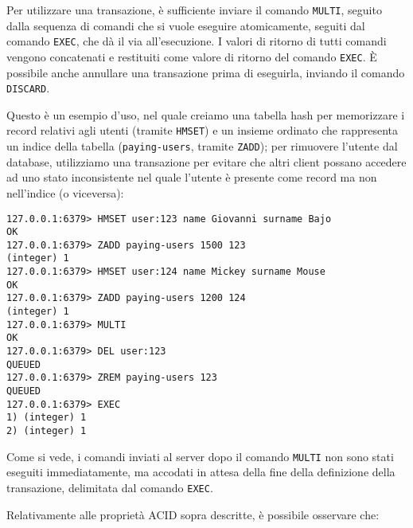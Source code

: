 Per utilizzare una transazione, è sufficiente inviare il comando \verb|MULTI|, seguito dalla 
sequenza di comandi che si vuole eseguire atomicamente, seguiti dal comando \verb|EXEC|, che dà
il via all'esecuzione. I valori di ritorno di tutti comandi vengono concatenati e restituiti come
valore di ritorno del comando \verb|EXEC|. È possibile anche annullare una transazione prima di
eseguirla, inviando il comando \verb|DISCARD|.

Questo è un esempio d'uso, nel quale creiamo una tabella hash per memorizzare i record relativi
agli utenti (tramite \verb|HMSET|) e un insieme ordinato che rappresenta un indice della tabella
(\verb|paying-users|, tramite \verb|ZADD|); per rimuovere l'utente dal database, utilizziamo una
transazione per evitare che altri client possano accedere ad uno stato inconsistente nel quale
l'utente è presente come record ma non nell'indice (o viceversa):

\medskip
\begin{lstlisting}
127.0.0.1:6379> HMSET user:123 name Giovanni surname Bajo
OK
127.0.0.1:6379> ZADD paying-users 1500 123
(integer) 1
127.0.0.1:6379> HMSET user:124 name Mickey surname Mouse
OK
127.0.0.1:6379> ZADD paying-users 1200 124
(integer) 1
127.0.0.1:6379> MULTI
OK
127.0.0.1:6379> DEL user:123
QUEUED
127.0.0.1:6379> ZREM paying-users 123
QUEUED
127.0.0.1:6379> EXEC
1) (integer) 1
2) (integer) 1
\end{lstlisting}

Come si vede, i comandi inviati al server dopo il comando \verb|MULTI| non sono stati eseguiti
immediatamente, ma accodati in attesa della fine della definizione della transazione, delimitata
dal comando \verb|EXEC|.

Relativamente alle proprietà ACID sopra descritte, è possibile osservare che:

